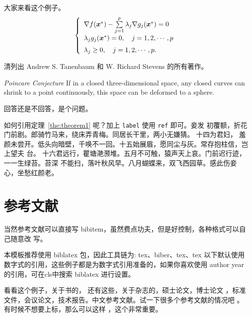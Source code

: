\documentclass[../Main/thesis.tex]{subfiles}
\begin{document}
\begin{example}
  大家来看这个例子。
  \begin{equation}
    \label{ktc}
    \left\{\begin{array}{l}
      \nabla f({\mbox{\boldmath $x$}}^*)-\sum\limits_{j=1}^p\lambda_j\nabla g_j({\mbox{\boldmath $x$}}^*)=0 \\[0.3cm]
      \lambda_jg_j({\mbox{\boldmath $x$}}^*)=0,\quad j=1,2,\cdots,p                                         \\[0.2cm]
      \lambda_j\ge 0,\quad j=1,2,\cdots,p.
    \end{array}\right.
  \end{equation}
\end{example}

\begin{exercise}
  清列出 Andrew S. Tanenbaum 和 W. Richard Stevens 的所有著作。
\end{exercise}

\begin{conjecture} \textit{Poincare Conjecture} If in a closed three-dimensional
  space, any closed curves can shrink to a point continuously, this space can be
  deformed to a sphere.
\end{conjecture}

\begin{problem}
回答还是不回答，是个问题。
\end{problem}

如何引用定理~\ref{the:theorem1} 呢？加上 \verb|label| 使用 \verb|ref| 即可。妾发
初覆额，折花门前剧。郎骑竹马来，绕床弄青梅。同居长干里，两小无嫌猜。 十四为君妇，
羞颜未尝开。低头向暗壁，千唤不一回。十五始展眉，愿同尘与灰。常存抱柱信，岂上望夫
台。 十六君远行，瞿塘滟滪堆。五月不可触，猿声天上哀。门前迟行迹，一一生绿苔。苔深
不能扫，落叶秋风早。八月蝴蝶来，双飞西园草。感此伤妾心，坐愁红颜老。

\section{参考文献}
\label{sec:bib}
当然参考文献可以直接写 bibitem，虽然费点功夫，但是好控制，各种格式可以自己随意改
写。

本模板推荐使用 biblatex 包，因此工具链为: tex、biber、tex、tex
以下默认使用数字式的引用，这些例子都是为数字式引用准备的，如果你喜欢使用 author year 的引用，可在cls中搜索 biblatex 进行设置。

看看这个例子，关于书的\cite{tex, companion,ColdSources}， 还有这些\cite{Krasnogor2004e, clzs, zjsw}，关于杂志的\cite{ELIDRISSI94, MELLINGER96, SHELL02}，硕士论文\cite{zhubajie, metamori2004}，博士论文 \cite{shaheshang, FistSystem01}，标准文件\cite{IEEE-1363}，会议论文\cite{DPMG,kocher99}，技术报告\cite{NPB2}。中文参考文献\cite{cnarticle}。试一下很多个参考文献的情况吧
\cite{BogdanSLOPEAdaptiveVariable2014, GossmannIdentificationsignificantgenetic2015, AlbrechtTopologicalapproachfuzzy1999, AlbrechtTopologicalConceptsHierarchies2001, AlbrechtTopologicaltheoryfuzziness1999, MoriasiModelevaluationguidelines2007, Jdatamodels2003}。
有时候不想要上标，那么可以这样 \parencite{shaheshang}，这个非常重要。%
\end{document}
